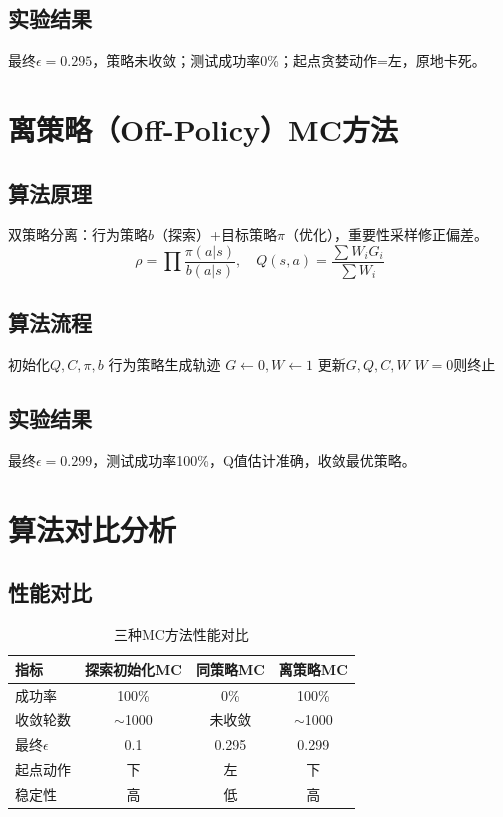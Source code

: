 \documentclass[11pt,a4paper]{article}
\begin{document}
\subsection{实验结果}
最终$\epsilon=0.295$，策略未收敛；测试成功率0\%；起点贪婪动作=左，原地卡死。

\section{离策略（Off-Policy）MC方法}
\subsection{算法原理}
双策略分离：行为策略$b$（探索）+目标策略$\pi$（优化），重要性采样修正偏差。
\[ \rho = \prod \frac{\pi(a|s)}{b(a|s)},\quad Q(s,a) = \frac{\sum W_i G_i}{\sum W_i} \]

\subsection{算法流程}
\begin{algorithm}[H]
\caption{离策略MC}
\begin{algorithmic}[1]
\STATE 初始化$Q,C,\pi,b$
    \STATE 行为策略生成轨迹
    \STATE $G\leftarrow0,W\leftarrow1$
        \STATE 更新$G,Q,C,W$
        \STATE $W=0$则终止
    \ENDFOR
\ENDFOR
\end{algorithmic}
\end{algorithm}

\subsection{实验结果}
最终$\epsilon=0.299$，测试成功率100\%，Q值估计准确，收敛最优策略。

\section{算法对比分析}
\subsection{性能对比}
\begin{table}[H]
\centering
\small
\caption{三种MC方法性能对比}
\begin{tabular}{lccc}
\toprule
\textbf{指标} & 探索初始化MC & 同策略MC & 离策略MC \\
\midrule
成功率 & 100\% & 0\% & 100\% \\
收敛轮数 & $\sim$1000 & 未收敛 & $\sim$1000 \\
最终$\epsilon$ & 0.1 & 0.295 & 0.299 \\
起点动作 & 下 & 左 & 下 \\
稳定性 & 高 & 低 & 高 \\
\bottomrule
\end{tabular}
\end{table}
\end{document}
